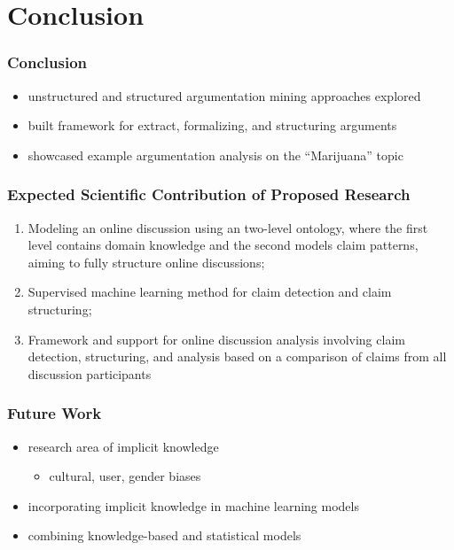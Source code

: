 \documentclass{beamer}
\begin{document}
\section{Conclusion}

\begin{frame}
\frametitle{Conclusion}
	\begin{itemize}
	\item unstructured and structured argumentation mining approaches explored
	\item built framework for extract, formalizing, and structuring arguments
	\item showcased example argumentation analysis on the ``Marijuana'' topic
	\end{itemize}
\end{frame}




\begin{frame}
	\frametitle{Expected Scientific Contribution of Proposed Research}
\begin{enumerate}
\item Modeling an online discussion using an two-level ontology, where the
	first level contains domain knowledge and the second models claim
	patterns, aiming to fully structure online discussions;
\item Supervised machine learning method for claim detection and claim
	structuring;
\item Framework and support for online discussion analysis involving claim
	detection, structuring, and analysis based on a comparison of claims
	from all discussion participants
\end{enumerate}

\end{frame}

\begin{frame}
	\frametitle{Future Work}
	\begin{itemize}
		\item research area of implicit knowledge
		\begin{itemize}
			\item cultural, user, gender biases
		\end{itemize}
		\item incorporating implicit knowledge in machine learning models
		\item combining knowledge-based and statistical models
	\end{itemize}
\end{frame}
\end{document}
